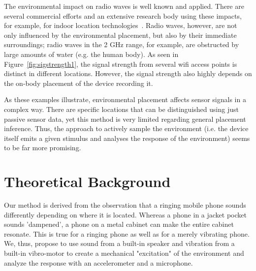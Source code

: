 The environmental impact on radio waves is well known and
applied. There are several commercial efforts and an extensive
research body using these impacts, for example, for indoor location
technologies~\cite{hightower2001lsu, 1067190}. Radio waves, however,
are not only influenced by the environmental placement, but also by
their immediate surroundings; radio waves in the 2 GHz range, for
example, are obstructed by large amounts of water (e.g. the human body). As seen in
Figure~\ref{fig:sigstrength1}, the signal strength from several wifi
access points is distinct in different locations. However, the signal
strength also highly depends on the on-body placement of the device
recording it. 

As these examples illustrate, environmental placement affects sensor
signals in a complex way. There are specific locations that can be
distinguished using just passive sensor data, yet this method is very
limited regarding general placement inference. Thus, the approach to
actively sample the environment (i.e. the device itself emits a given stimulus and analyses the
response of the environment) seems to be far more promising.


\section{Theoretical Background}
\label{onoff:background}
Our method is derived from the observation that a ringing mobile phone
sounds differently depending on where it is located. Whereas a phone
in a jacket pocket sounds 'dampened', a phone on a metal cabinet can
make the entire cabinet resonate. This is true for a ringing phone as
well as for a merely vibrating phone. We, thus, propose to use sound from
a built-in speaker and vibration from a built-in vibro-motor to create
a mechanical "excitation" of the environment and analyze the response
with an accelerometer and a microphone.


